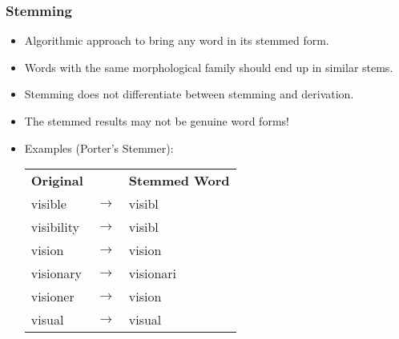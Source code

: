 \documentclass[a4paper, 11pt, accentcolor = tud3b]{tudreport}
\begin{document}
                \subsubsection{Stemming} %
                    \begin{itemize}
                    	\item Algorithmic approach to bring any word in its stemmed form.
                    	\item Words with the same morphological family should end up in similar stems.
                    	\item Stemming does not differentiate between stemming and derivation.
                    	\item The stemmed results may not be genuine word forms!
                    	\item Examples (Porter's Stemmer):
                    		\begin{table}[H]
                    			\centering
                    			\begin{tabular}{l c l}
                    				\textbf{Original} &                 & \textbf{Stemmed Word} \\
                    				visible           & \(\rightarrow\) & visibl                \\
                    				visibility        & \(\rightarrow\) & visibl                \\
                    				vision            & \(\rightarrow\) & vision                \\
                    				visionary         & \(\rightarrow\) & visionari             \\
                    				visioner          & \(\rightarrow\) & vision                \\
                    				visual            & \(\rightarrow\) & visual
                    			\end{tabular}
                    		\end{table}
                    \end{itemize}
\end{document}
